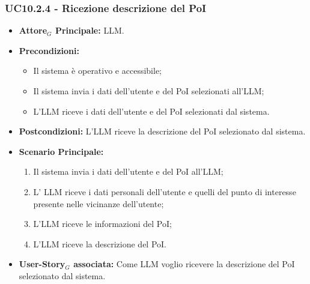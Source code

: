 \documentclass[11pt]{article}
\begin{document}
\begin{justify}
\subsubsection{\textbf{UC10.2.4 - Ricezione descrizione del PoI}}
\begin{itemize}
    \item \textbf{Attore$_G$ Principale:} LLM.
    \item \textbf{Precondizioni:} 
        \begin{itemize}
          \item Il sistema è operativo e accessibile;
          \item Il sistema invia i dati dell'utente e del PoI selezionati all'LLM;
            \item L'LLM riceve i dati dell'utente e del PoI selezionati dal sistema.
        \end{itemize}
      \item \textbf{Postcondizioni:} L'LLM riceve la descrizione del PoI selezionato dal sistema.
    \item \textbf{Scenario Principale:} 
        \begin{enumerate}
          \item Il sistema invia i dati dell'utente e del PoI all'LLM;
        \item L' LLM riceve i dati personali dell'utente e quelli del punto di interesse presente nelle vicinanze dell'utente;
          \item L'LLM riceve le informazioni del PoI;
          \item L'LLM riceve la descrizione del PoI.
        \end{enumerate}
      \item \textbf{User-Story$_G$ associata:} Come LLM voglio ricevere la descrizione del PoI selezionato dal sistema.
\end{itemize}

\end{justify}
\end{document}
